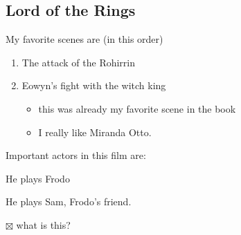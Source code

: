 \documentclass[11pt]{article}
\begin{document}
\subsection{Lord of the Rings}
\label{sec:orgheadline7}
My favorite scenes are (in this order)
\begin{enumerate}
\item The attack of the Rohirrin
\item Eowyn's fight with the witch king
\begin{itemize}
\item this was already my favorite scene in the book
\item I really like Miranda Otto.
\end{itemize}
\end{enumerate}
Important actors in this film are:
\begin{description}
\item[{Elijah Wood}] He plays Frodo
\item[{Sean Asting}] He plays Sam, Frodo's friend.
\item $\boxtimes$ what is this?
\end{description}
\end{document}
